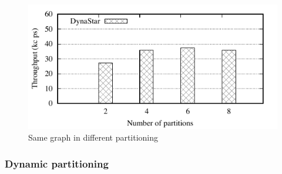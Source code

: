 \begin{figure}[ht]
	\includegraphics{figures/experiments/throughput-avg-vary-partition}
	\caption{Same graph in different partitioning}
	\label{fig:4p1p_varying_partition_size}
\end{figure}

\subsubsection{Dynamic partitioning}




\label{sec:evaluation:strongloc}

